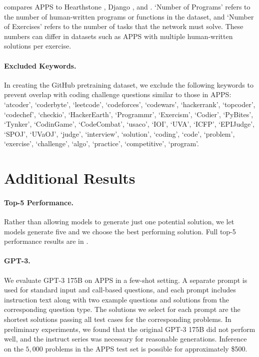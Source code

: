  compares APPS to Hearthstone \citep{Ling2016LatentPN}, Django \citep{oda2015ase:pseudogen1}, and \citet{Zavershynskyi2018NAPSNP}. `Number of Programs' refers to the number of human-written programs or functions in the dataset, and `Number of Exercises' refers to the number of tasks that the network must solve. These numbers can differ in datasets such as APPS with multiple human-written solutions per exercise.





\paragraph{Excluded Keywords.}\label{appx:excluded_keywords} In creating the GitHub pretraining dataset, we exclude the following keywords to prevent overlap with coding challenge questions similar to those in APPS: `atcoder', `coderbyte', `leetcode', `codeforces', `codewars', `hackerrank', `topcoder', `codechef', `checkio', `HackerEarth', `Programmr', `Exercism', `Codier', `PyBites', `Tynker', `CodinGame', `CodeCombat', `usaco', `IOI', `UVA', `ICFP', `EPIJudge', `SPOJ', `UVaOJ', `judge', `interview', `solution', `coding', `code', `problem', `exercise', `challenge', `algo', `practice', `competitive', `program'.

\section{Additional Results}

\paragraph{Top-5 Performance.} Rather than allowing models to generate just one potential solution, we let models generate five and we choose the best performing solution. Full top-5 performance results are in .

\paragraph{GPT-3.}
We evaluate GPT-3 175B on APPS in a few-shot setting. A separate prompt is used for standard input and call-based questions, and each prompt includes instruction text along with two example questions and solutions from the corresponding question type. The solutions we select for each prompt are the shortest solutions passing all test cases for the corresponding problems. In preliminary experiments, we found that the original GPT-3 175B did not perform well, and the instruct series was necessary for reasonable generations. Inference on the $5,\!000$ problems in the APPS test set is possible for approximately \$500.

